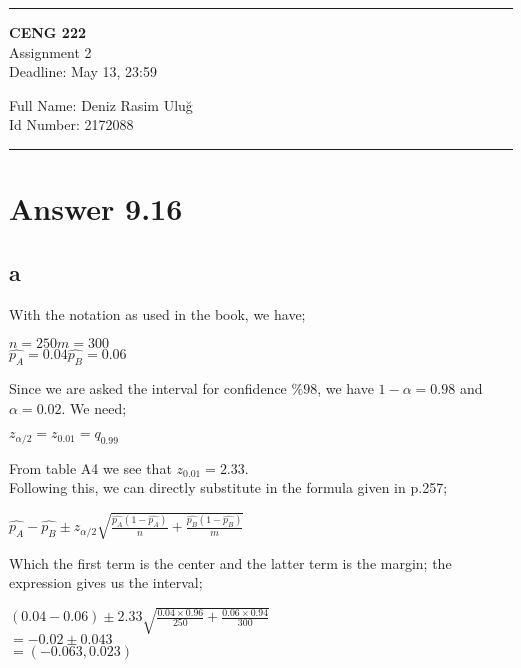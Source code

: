 \documentclass[11pt]{article}
\newcommand{\HRule}{\rule{\linewidth}{1mm}}
\begin{document}
\noindent
\HRule
\begin{center}
\Large 
\textbf{CENG 222}  \\
\normalsize 
Assignment 2 \\
Deadline: May 13, 23:59 \\
\end{center}
\begin{flushleft}
\normalsize 
	Full Name: Deniz Rasim Uluğ \\
	Id Number:	2172088
\end{flushleft}
\HRule

\section*{Answer 9.16}
\subsection*{a}

With the notation as used in the book, we have;
\begin{center}
$n=250$\quad$m=300$\\
$ \hat{p_A} =0.04$\quad$\hat{p_B} =0.06$\\
\end{center}
Since we are asked the interval for confidence $\%98$, we have $1-\alpha =0.98$ and $\alpha =0.02$. We need;
\begin{center}
$z_{\alpha /2}=z_{0.01}=q_{0.99}$\\
\end{center}
From table A4 we see that $z_{0.01}=2.33$.\\

Following this, we can directly substitute in the formula given in p.257;
\begin{center}
$ \hat{p_A} -\hat{p_B} \pm  z_{\alpha /2} \sqrt{\frac{\hat{p_A} (1-\hat{p_A} )}{n}+\frac{\hat{p_B} (1-\hat{p_B} )}{m}}$
\end{center}

Which the first term is the center and the latter term is the margin; the expression gives us the interval;

\begin{center}
$(0.04-0.06)\pm 2.33\sqrt{\frac{0.04\times 0.96}{250}+\frac{0.06\times 0.94}{300}}$\\
$= -0.02 \pm 0.043 $\\
$= (-0.063,0.023) $
\end{center}
\end{document}
